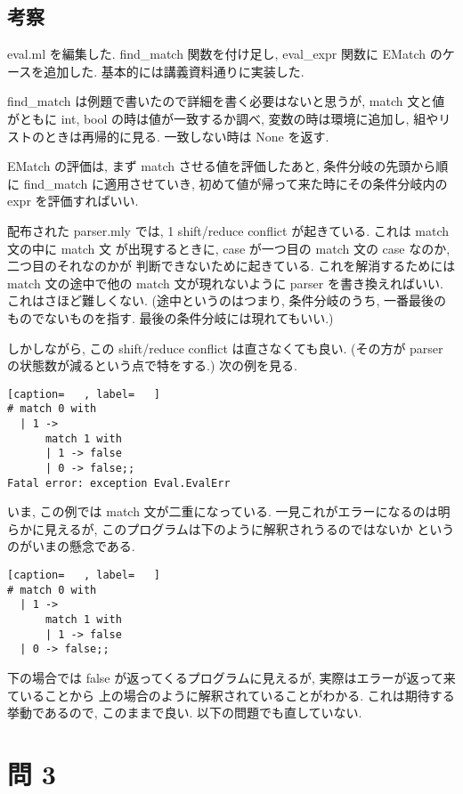 \documentclass[dvipdfmx]{jsarticle}
\begin{document}
\subsection*{考察}
eval.ml を編集した.
find\_match 関数を付け足し, eval\_expr 関数に EMatch のケースを追加した.
基本的には講義資料通りに実装した.

find\_match は例題で書いたので詳細を書く必要はないと思うが,
match 文と値がともに
int, bool の時は値が一致するか調べ,
変数の時は環境に追加し, 組やリストのときは再帰的に見る.
一致しない時は None を返す.

EMatch の評価は, まず match させる値を評価したあと,
条件分岐の先頭から順に find\_match に適用させていき,
初めて値が帰って来た時にその条件分岐内の expr を評価すればいい.



配布された parser.mly では, 1 shift/reduce conflict
が起きている.
これは match 文の中に match 文 が出現するときに,
case が一つ目の match 文の case なのか, 二つ目のそれなのかが
判断できないために起きている.
これを解消するためには match 文の途中で他の match 文が現れないように
parser を書き換えればいい. これはさほど難しくない.
(途中というのはつまり, 条件分岐のうち, 一番最後のものでないものを指す.
最後の条件分岐には現れてもいい.)

しかしながら, この shift/reduce conflict は直さなくても良い.
(その方が parser の状態数が減るという点で特をする.)
次の例を見る.

\begin{lstlisting}[caption=   , label=   ]
# match 0 with
  | 1 ->
      match 1 with
      | 1 -> false
      | 0 -> false;;
Fatal error: exception Eval.EvalErr
\end{lstlisting}

いま, この例では match 文が二重になっている.
一見これがエラーになるのは明らかに見えるが,
このプログラムは下のように解釈されうるのではないか
というのがいまの懸念である.

\begin{lstlisting}[caption=   , label=   ]
# match 0 with
  | 1 ->
      match 1 with
      | 1 -> false
  | 0 -> false;;
\end{lstlisting}

下の場合では false が返ってくるプログラムに見えるが,
実際はエラーが返って来ていることから
上の場合のように解釈されていることがわかる.
これは期待する挙動であるので, このままで良い.
以下の問題でも直していない.


\newpage
\section*{問 3}
\end{document}
